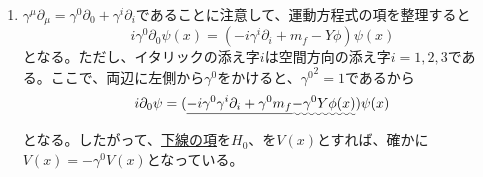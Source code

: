\documentclass[unicode,a4paper,10pt]{ltjsarticle}
\begin{document}
\begin{enumerate}
  \item
        $\gamma^{\mu}\partial_{\mu}=\gamma^{0}\partial_{0}+\gamma^{i}\partial_{i}$であることに注意して、運動方程式の項を整理すると
        \begin{equation}
          i\gamma^{0}\partial_{0}\psi(x)
          =
          (-i\gamma^{i}\partial_{i}+m_{f}-Y\phi)\psi(x)
        \end{equation}
        となる。ただし、イタリックの添え字$i$は空間方向の添え字$i=1,2,3$である。ここで、両辺に左側から$\gamma^{0}$をかけると、${\gamma^{0}}^2=1$であるから
        \begin{equation}
          i\partial_{0}\psi
          =
          (
            \uline{-i\gamma^{0}\gamma^{i}\partial_{i}
            +
            \gamma^{0}m_{f}
            }
            \uwave{
            -
            \gamma^{0}Y\phi(x)
            }
          )\psi(x)
        \end{equation}
        となる。したがって、\uline{下線の項}を$H_{0}$、を$V(x)$とすれば、確かに$V(x)=-\gamma^{0}V(x)$となっている。








\end{enumerate}

% 
% 
\end{document}
